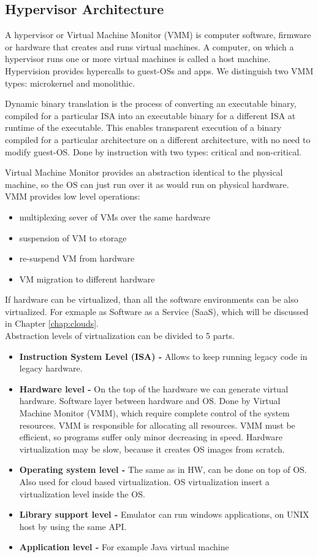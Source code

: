 \documentclass[12pt]{report}
\begin{document}
\subsection{Hypervisor Architecture}
A hypervisor or Virtual Machine Monitor (VMM) is computer software, firmware or hardware that creates and runs virtual machines. A computer, on which a hypervisor runs one or more virtual machines is called a host machine. Hypervision provides hypercalls to guest-OSs and apps. We distinguish two VMM types: microkernel and monolithic.

Dynamic binary translation is the process of converting an executable binary, compiled for a particular ISA into an executable binary for a different ISA at runtime of the executable. This enables transparent execution of a binary compiled for a particular architecture on a different architecture, with no need to modify guest-OS. Done by instruction with two types: critical and non-critical.

Virtual Machine Monitor provides an abstraction identical to the physical machine, so the OS can just run over it as would run on physical hardware. VMM provides low level operations:
\begin{itemize}
\item multiplexing sever of VMs over the same hardware
\item suspension of VM to storage
\item re-suspend VM from hardware
\item VM migration to different hardware
\end{itemize}

If hardware can be virtualized, than all the software environments can be also virtualized. For exmaple as Software as a Service (SaaS), which will be discussed in Chapter \ref{chap:clouds}. \\
\newline
Abstraction levels of virtualization can be divided to 5 parts.
\begin{itemize}
\item \textbf{Instruction System Level (ISA) -}
		Allows to keep running legacy code in legacy hardware.
\item \textbf{Hardware level -}
		On the top of the hardware we can generate virtual hardware. Software layer between hardware and OS. Done by Virtual Machine Monitor (VMM), which require complete control of the system resources. VMM is responsible for allocating all resources. VMM must be efficient, so programs suffer only minor decreasing in speed. Hardware virtualization may be slow, because it creates OS images from scratch.
\item\textbf{ Operating system level -}
		The same as in HW, can be done on top of OS. Also used for cloud based virtualization. OS virtualization insert a virtualization level inside the OS.
\item \textbf{Library support level -}
		Emulator can run windows applications, on UNIX host by using the same API.
\item\textbf{ Application level -}
		For example Java virtual machine
\end{itemize}
\end{document}
